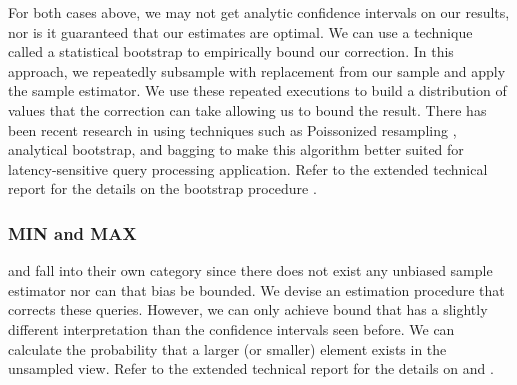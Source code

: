 For both cases above, we may not get analytic confidence intervals on our results, nor is it guaranteed that our estimates are optimal.
We can use a technique called a statistical bootstrap \cite{AgarwalMPMMS13} to empirically bound our correction.
In this approach, we repeatedly subsample with replacement from our sample and apply the sample estimator.
We use these repeated executions to build a distribution of values that the correction can take allowing us to bound the result.
There has been recent research in using techniques such as Poissonized resampling \cite{agarwalknowing}, analytical bootstrap\cite{DBLP:conf/sigmod/ZengGMZ14}, and bagging \cite{DBLP:conf/kdd/KleinerTASJ13} to make this algorithm better suited for latency-sensitive query processing application.
Refer to the extended technical report for the details on the bootstrap procedure \cite{technicalReport}.

\subsubsection{MIN and MAX}
\minfunc and \maxfunc fall into their own category since there does not exist any unbiased sample estimator nor can that bias be bounded.
We devise an estimation procedure that corrects these queries.
However, we can only achieve bound that has a slightly different interpretation than the confidence intervals seen before.
We can calculate the probability that a larger (or smaller) element exists in the unsampled view.
Refer to the extended technical report for the details on \minfunc and \maxfunc \cite{technicalReport}.

\iffalse
We devise the following correction estimate for \maxfunc: (1) For all rows in both $S$ and $S'$, calculate the row-by-row difference, (2) let $c$ be the max difference, and (3) add $c$ to the max of the stale view.

We can give weak bounds on the results using Cantelli's Inequality.
If $X$ is a random variable with mean $\mu_x$ and variance $var(X)$, then the probability that $X$ is larger than a constant $\epsilon$ 
\[
\mathbb{P}(X \ge \epsilon + \mu_x ) \le \frac{var(X)}{var(X) + \epsilon^2}
\]
Therefore, if we set $\epsilon$ to be the difference between max value estimate and the average value, we can calculate the probability that we will see a higher value. 

The same estimator can be modified for \minfunc, with a corresponding bound:
\[
\mathbb{P}(X \le \mu_x - a )) \le \frac{var(x)}{var(x) + a^2}
\]
This bound has a slightly different interpretation than the confidence intervals seen before.
This gives the probability that a larger (or smaller) element exists in the unsampled view.
\fi


